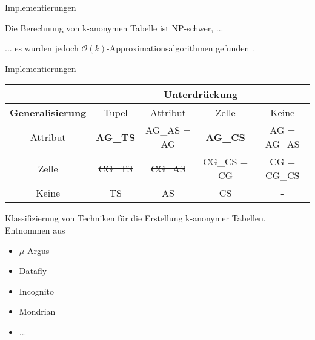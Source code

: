 \begin{frame}[c]{Implementierungen}
	\begin{center}
		Die Berechnung von k-anonymen Tabelle ist NP-schwer, ...\\
		\pause
		\vspace{0.5cm}

		... es wurden jedoch \(\mathcal{O}(k)\)-Approximationsalgorithmen gefunden \cite{aggarwal, meyerson}.
	\end{center}
\end{frame}
	
\begin{frame}{Implementierungen}
	\begin{center}
		\begin{tabular}{|c||c|c|c|c|}
			\hline & \multicolumn{4}{c|}{\textbf{Unterdrückung}}\\
			\hline \textbf{Generalisierung} & Tupel & Attribut & Zelle & Keine \\ \hline
			\hline Attribut & \textbf{AG\_TS} & AG\_AS \tiny = AG & \textbf{AG\_CS} & AG \tiny = AG\_AS \\ 
			\hline Zelle & \sout{CG\_TS} & \sout{CG\_AS} & CG\_CS \tiny = CG & CG \tiny = CG\_CS\\ 
			\hline Keine & TS & AS & CS & - \\ 
			\hline 
		\end{tabular} 
		\vspace{0.2cm}
	
		\tiny Klassifizierung von Techniken für die Erstellung k-anonymer Tabellen. Entnommen aus \cite{Ciriani}

		\vspace{0.5cm}
		\pause

		\begin{varwidth}{1in}
			\begin{itemize}
				\item \(\mu\)-Argus
				\item Datafly
				\item Incognito
				\item Mondrian
				\item ...
			\end{itemize}
		\end{varwidth}
	\end{center}
\end{frame}


